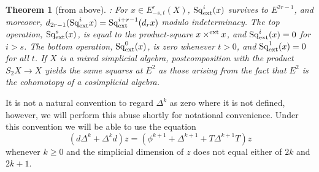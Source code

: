 \documentclass[11pt]{amsart}
\theoremstyle{plain}
\newtheorem{thm}{Theorem}[section]
\theoremstyle{definition}
\let\oldphi\phi
\let\phi\varphi
\renewcommand{\to}{\longrightarrow}
\theoremstyle{plain}
\newcommand{\DeltaUp}{\Delta}%
\newcommand{\Sq}{\mathrm{Sq}}
\begin{document}
\begin{External spectral sequence operations}
\begin{thm}
[from above]: For $x\in E^r_{-s,t}(X)$, $\Sq^i_\textup{ext}(x)$ survives to $E^{2r-1}$, and moreover, $d_{2r-1}(\Sq^i_\textup{ext}x)=\Sq^{i+r-1}_\textup{ext}(d_rx)$ modulo indeterminacy. The top operation, $\Sq^s_\textup{ext}(x)$, is equal to the product-square $x\times^\textup{ext} x$, and $\Sq^i_\textup{ext}(x)=0$ for $i>s$. The bottom operation, $\Sq^0_\textup{ext}(x)$, is zero whenever $t>0$, and $\Sq^1_\textup{ext}(x)=0$ for all $t$. If $X$ is a mixed simplicial algebra, postcomposition with the product $S_2X\to X$ yields the same squares at $E^2$ as those arising from the fact that $E^2$ is the cohomotopy of a cosimplicial algebra.
\end{thm}






{\tiny It is not a natural convention to regard $\DeltaUp^k$ as zero where it is not defined, however, we will perform this abuse shortly for notational convenience. Under this convention we will be able to use the equation
\[(d\DeltaUp^k+\DeltaUp^kd)z=(\oldphi^{k+1} +\DeltaUp^{k+1}+T\DeltaUp^{k+1}T)z\]
whenever $k\geq0$ and the simplicial dimension of $z$ does not equal either of $2k$ and $2k+1$.}


\end{External spectral sequence operations}
\end{document}
